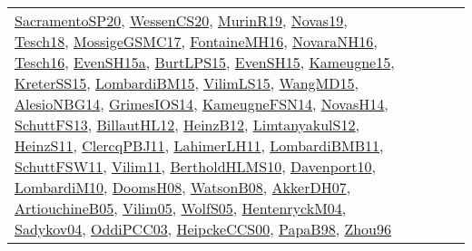 {\begin{longtable}{lp{3cm}>{\raggedright}p{6cm}>{\raggedright}p{6cm}p{8cm}}
\href{articles/SacramentoSP20.pdf}{SacramentoSP20}\cite{SacramentoSP20}, \href{papers/WessenCS20.pdf}{WessenCS20}\cite{WessenCS20}, \href{papers/MurinR19.pdf}{MurinR19}\cite{MurinR19}, \href{articles/Novas19.pdf}{Novas19}\cite{Novas19}, \href{papers/Tesch18.pdf}{Tesch18}\cite{Tesch18}, \href{papers/MossigeGSMC17.pdf}{MossigeGSMC17}\cite{MossigeGSMC17}, \href{papers/FontaineMH16.pdf}{FontaineMH16}\cite{FontaineMH16}, \href{articles/NovaraNH16.pdf}{NovaraNH16}\cite{NovaraNH16}, \href{papers/Tesch16.pdf}{Tesch16}\cite{Tesch16}, \href{articles/EvenSH15a.pdf}{EvenSH15a}\cite{EvenSH15a}, \href{papers/BurtLPS15.pdf}{BurtLPS15}\cite{BurtLPS15}, \href{papers/EvenSH15.pdf}{EvenSH15}\cite{EvenSH15}, \href{articles/Kameugne15.pdf}{Kameugne15}\cite{Kameugne15}, \href{papers/KreterSS15.pdf}{KreterSS15}\cite{KreterSS15}, \href{papers/LombardiBM15.pdf}{LombardiBM15}\cite{LombardiBM15}, \href{papers/VilimLS15.pdf}{VilimLS15}\cite{VilimLS15}, \href{articles/WangMD15.pdf}{WangMD15}\cite{WangMD15}, \href{papers/AlesioNBG14.pdf}{AlesioNBG14}\cite{AlesioNBG14}, \href{articles/GrimesIOS14.pdf}{GrimesIOS14}\cite{GrimesIOS14}, \href{articles/KameugneFSN14.pdf}{KameugneFSN14}\cite{KameugneFSN14}, \href{articles/NovasH14.pdf}{NovasH14}\cite{NovasH14}, \href{papers/SchuttFS13.pdf}{SchuttFS13}\cite{SchuttFS13}, \href{papers/BillautHL12.pdf}{BillautHL12}\cite{BillautHL12}, \href{papers/HeinzB12.pdf}{HeinzB12}\cite{HeinzB12}, \href{articles/LimtanyakulS12.pdf}{LimtanyakulS12}\cite{LimtanyakulS12}, \href{papers/HeinzS11.pdf}{HeinzS11}\cite{HeinzS11}, \href{papers/ClercqPBJ11.pdf}{ClercqPBJ11}\cite{ClercqPBJ11}, \href{papers/LahimerLH11.pdf}{LahimerLH11}\cite{LahimerLH11}, \href{papers/LombardiBMB11.pdf}{LombardiBMB11}\cite{LombardiBMB11}, \href{articles/SchuttFSW11.pdf}{SchuttFSW11}\cite{SchuttFSW11}, \href{papers/Vilim11.pdf}{Vilim11}\cite{Vilim11}, \href{papers/BertholdHLMS10.pdf}{BertholdHLMS10}\cite{BertholdHLMS10}, \href{papers/Davenport10.pdf}{Davenport10}\cite{Davenport10}, \href{papers/LombardiM10.pdf}{LombardiM10}\cite{LombardiM10}, \href{papers/DoomsH08.pdf}{DoomsH08}\cite{DoomsH08}, \href{papers/WatsonB08.pdf}{WatsonB08}\cite{WatsonB08}, \href{papers/AkkerDH07.pdf}{AkkerDH07}\cite{AkkerDH07}, \href{papers/ArtiouchineB05.pdf}{ArtiouchineB05}\cite{ArtiouchineB05}, \href{papers/Vilim05.pdf}{Vilim05}\cite{Vilim05}, \href{papers/WolfS05.pdf}{WolfS05}\cite{WolfS05}, \href{papers/HentenryckM04.pdf}{HentenryckM04}\cite{HentenryckM04}, \href{papers/Sadykov04.pdf}{Sadykov04}\cite{Sadykov04}, \href{papers/OddiPCC03.pdf}{OddiPCC03}\cite{OddiPCC03}, \href{articles/HeipckeCCS00.pdf}{HeipckeCCS00}\cite{HeipckeCCS00}, \href{articles/PapaB98.pdf}{PapaB98}\cite{PapaB98}, \href{papers/Zhou96.pdf}{Zhou96}\cite{Zhou96}\\

\end{longtable}}
